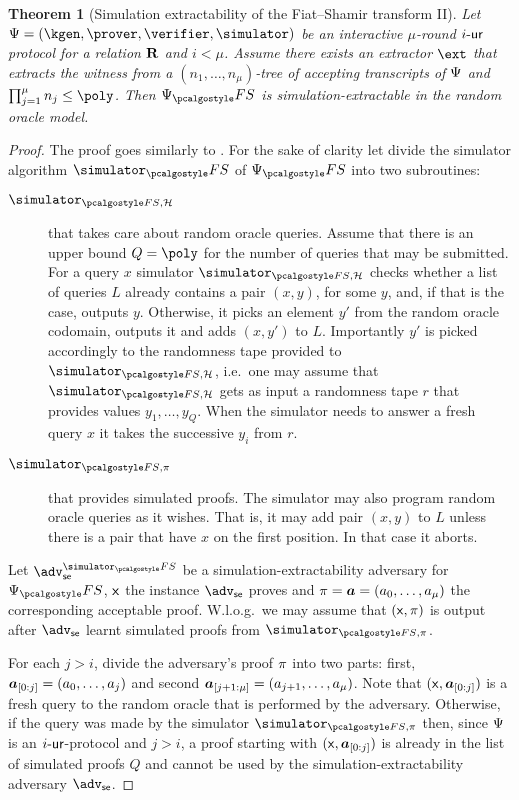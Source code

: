 \documentclass[runningheads,11pt]{llncs}
\let\spvec\vec
\let\vec\accentvec
\let\vec\spvec
\def\vec#1{\mathchoice{\mbox{\boldmath$\displaystyle#1$}}
	{\mbox{\boldmath$\textstyle#1$}}
	{\mbox{\boldmath$\scriptstyle#1$}}
	{\mbox{\boldmath$\scriptscriptstyle#1$}}}
\newtheorem{theorem}{Theorem}%
\theoremstyle{definition}
\begin{document}
	\begin{theorem}[Simulation extractability of the Fiat--Shamir transform II]
		\label{thm:wit_ext_em_FS_II}
		Let $\proofsystem = (\kgen, \prover, \verifier, \simulator)$ be an interactive $\mu$-round ${i\text{-}\mathsf{ur}}$ protocol for a relation $\mathbf{R}$ and $i < \mu$.
		Assume there exists an extractor $\ext$ that extracts the witness from a $(n_1, \ldots, n_\mu)$-tree of accepting transcripts of $\mathrm{\Psi}$ and $\prod_{j = 1}^\mu n_j \leq \poly$.
		Then $\proofsystem_\fs$ is simulation-extractable in the random oracle model.
	\end{theorem}
	\begin{proof}
		The proof goes similarly to \cite[Theorem 3]{INDOCRYPT:FKMV12}. For the sake of clarity let divide the simulator algorithm $\simulator_\fs$ of $\proofsystem_\fs$  into two subroutines:
		\begin{description}
			\item[$\simulator_{\fs, \ro}$] that takes care about random oracle queries. Assume that there is an upper bound $Q = \poly$ for the number of queries that may be submitted.
			For a query $x$ simulator $\simulator_{\fs, \ro}$ checks whether a list of queries $L$ already contains a pair $(x, y)$, for some $y$, and, if that is the case, outputs $y$.
			Otherwise, it picks an element $y'$ from the random oracle codomain, outputs it and adds $(x, y')$ to $L$. Importantly $y'$ is picked accordingly to the randomness tape provided to $\simulator_{\fs, \ro}$, i.e.~one may assume that $\simulator_{\fs, \ro}$ gets as input a randomness tape $r$ that provides values $y_1, \ldots, y_Q$.
			When the simulator needs to answer a fresh query $x$ it takes the successive $y_i$ from $r$.
			\item[$\simulator_{\fs, \zkproof}$] that provides simulated proofs. The simulator may also program random oracle queries as it wishes. That is, it may add pair $(x, y)$ to $L$ unless there is a pair that have $x$ on the first position. In that case it aborts.
		\end{description}

		Let $\adv_\se^{\simulator_\fs}$ be a simulation-extractability adversary for $\proofsystem_\fs$, $\mathsf{x}$ the instance $\adv_\se$ proves and $\zkproof = \vec{a} = (a_0, \ldots, a_\mu)$ the corresponding acceptable proof.
		W.l.o.g.~we may assume that $(\mathsf{x}, \pi)$ is output after $\adv_\se$ learnt simulated proofs from $\simulator_{\fs, \zkproof}$.

		For each $j > i$, divide the adversary's proof $\pi$ into two parts:
		first, $\vec{a}_{[0:j]} = (a_0, \ldots, a_j)$ and second $\vec{a}_{{[j + 1:\mu]}} = (a_{j + 1}, \ldots, a_\mu)$.
		Note that $(\inp, \vec{a}_{[0:j]})$ is a fresh query to the random oracle that is performed by the adversary.
		Otherwise, if the query was made by the simulator $\simulator_{\fs, \zkproof}$ then, since $\mathrm{\Psi}$ is an ${i\text{-}\mathsf{ur}}$-protocol and $j > i$, a proof starting with $(\inp, \vec{a}_{[0:j]})$ is already in the list of simulated proofs $Q$ and cannot be used by the simulation-extractability adversary $\adv_\se$.


\end{proof}
\end{document}
